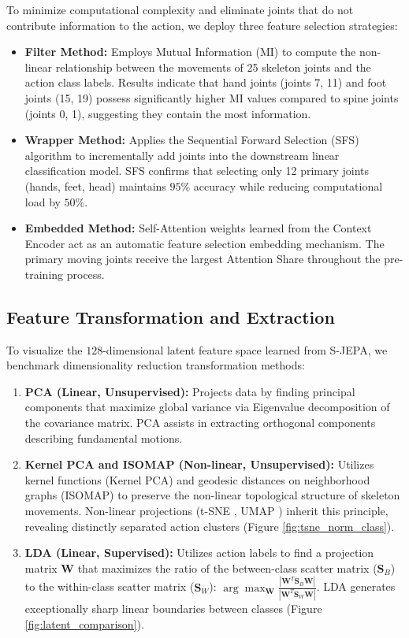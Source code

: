 \documentclass[conference]{IEEEtran}
\begin{document}
To minimize computational complexity and eliminate joints that do not contribute information to the action, we deploy three feature selection strategies:
\begin{itemize}
    \item \textbf{Filter Method:} Employs Mutual Information (MI) to compute the non-linear relationship between the movements of 25 skeleton joints and the action class labels. Results indicate that hand joints (joints 7, 11) and foot joints (15, 19) possess significantly higher MI values compared to spine joints (joints 0, 1), suggesting they contain the most information.
    \item \textbf{Wrapper Method:} Applies the Sequential Forward Selection (SFS) algorithm to incrementally add joints into the downstream linear classification model. SFS confirms that selecting only 12 primary joints (hands, feet, head) maintains $95\%$ accuracy while reducing computational load by $50\%$.
    \item \textbf{Embedded Method:} Self-Attention weights learned from the Context Encoder act as an automatic feature selection embedding mechanism. The primary moving joints receive the largest Attention Share throughout the pre-training process.
\end{itemize}

\subsection{Feature Transformation and Extraction}

To visualize the $128$-dimensional latent feature space learned from S-JEPA, we benchmark dimensionality reduction transformation methods:
\begin{enumerate}
    \item \textbf{PCA (Linear, Unsupervised):} Projects data by finding principal components that maximize global variance via Eigenvalue decomposition of the covariance matrix. PCA assists in extracting orthogonal components describing fundamental motions.
    \item \textbf{Kernel PCA and ISOMAP (Non-linear, Unsupervised):} Utilizes kernel functions (Kernel PCA) and geodesic distances on neighborhood graphs (ISOMAP) to preserve the non-linear topological structure of skeleton movements. Non-linear projections (t-SNE \cite{b14}, UMAP \cite{b15}) inherit this principle, revealing distinctly separated action clusters (Figure \ref{fig:tsne_norm_class}).
    \item \textbf{LDA (Linear, Supervised):} Utilizes action labels to find a projection matrix $\mathbf{W}$ that maximizes the ratio of the between-class scatter matrix ($\mathbf{S}_B$) to the within-class scatter matrix ($\mathbf{S}_W$): $\arg\max_{\mathbf{W}} \frac{|\mathbf{W}^T \mathbf{S}_B \mathbf{W}|}{|\mathbf{W}^T \mathbf{S}_W \mathbf{W}|}$. LDA generates exceptionally sharp linear boundaries between classes (Figure \ref{fig:latent_comparison}).
\end{enumerate}
\end{document}

